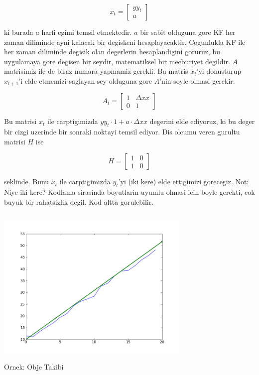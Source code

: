 \documentclass[12pt,fleqn]{article}\usepackage{../common}
\begin{document}
\[ x_t = 
\left[\begin{array}{r}
yy_t \\
a
\end{array}\right]
 \]

ki burada $a$ harfi egimi temsil etmektedir. $a$ bir sabit olduguna gore
KF her zaman diliminde ayni kalacak bir degiskeni
hesaplayacaktir. Cogunlukla KF ile her zaman diliminde degisik olan
degerlerin hesaplandigini goruruz, bu uygulamaya gore degisen bir seydir,
matematiksel bir mecburiyet degildir. $A$ matrisimiz ile de biraz numara
yapmamiz gerekli. Bu matris $x_t$'yi donusturup $x_{t+1}$'i elde etmemizi
saglayan sey olduguna gore $A$'nin soyle olmasi gerekir:

\[ 
A_t = 
\left[\begin{array}{rr}
1 & \Delta xx \\
0 & 1
\end{array}\right]
 \]

Bu matrisi $x_t$ ile carptigimizda $yy_t \cdot 1 + a \cdot \Delta xx$
degerini elde ediyoruz, ki bu deger bir cizgi uzerinde bir sonraki noktayi
temsil ediyor. Dis olcumu veren gurultu matrisi $H$ ise

\[ H =
\left[\begin{array}{rr}
1 & 0 \\
1 & 0
\end{array}\right]
 \]

seklinde. Bunu $x_t$ ile carptigimizda $y_t$'yi (iki kere) elde ettigimizi
gorecegiz.  Not: Niye iki kere? Kodlama sirasinda boyutlarin uyumlu olmasi
icin boyle gerekti, cok buyuk bir rahatsizlik degil. Kod altta
gorulebilir.

\inputminted{python}{kalman_slope.py}

\includegraphics[height=7cm]{kalman-line-fit.png}

Ornek: Obje Takibi
\end{document}
